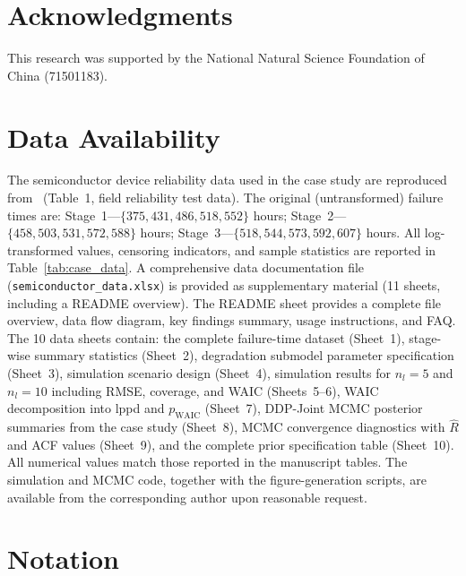 \documentclass[a4paper,fleqn,longmktitle]{cas-sc}
\begin{document}
\section*{Acknowledgments}
This research was supported by the National Natural Science Foundation of China (71501183).

\section*{Data Availability}
The semiconductor device reliability data used in the case study are reproduced from~\cite{Liu2026a} (Table~1, field reliability test data). The original (untransformed) failure times are: Stage~1---$\{375, 431, 486, 518, 552\}$ hours; Stage~2---$\{458, 503, 531, 572, 588\}$ hours; Stage~3---$\{518, 544, 573, 592, 607\}$ hours. All log-transformed values, censoring indicators, and sample statistics are reported in Table~\ref{tab:case_data}. A comprehensive data documentation file (\texttt{semiconductor\_data.xlsx}) is provided as supplementary material (11 sheets, including a README overview). The README sheet provides a complete file overview, data flow diagram, key findings summary, usage instructions, and FAQ. The 10 data sheets contain: the complete failure-time dataset (Sheet~1), stage-wise summary statistics (Sheet~2), degradation submodel parameter specification (Sheet~3), simulation scenario design (Sheet~4), simulation results for $n_l=5$ and $n_l=10$ including RMSE, coverage, and WAIC (Sheets~5--6), WAIC decomposition into lppd and $p_{\mathrm{WAIC}}$ (Sheet~7), DDP-Joint MCMC posterior summaries from the case study (Sheet~8), MCMC convergence diagnostics with $\widehat{R}$ and ACF values (Sheet~9), and the complete prior specification table (Sheet~10). All numerical values match those reported in the manuscript tables. The simulation and MCMC code, together with the figure-generation scripts, are available from the corresponding author upon reasonable request.

\printcredits

%


\clearpage
\appendix

\section{Notation}
\label{sec:not}
\end{document}
